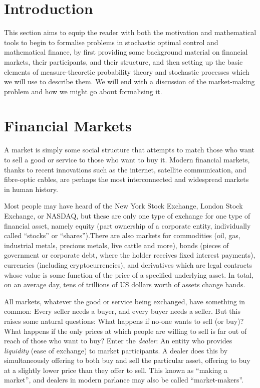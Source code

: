 \section{Introduction}
This section aims to equip the reader with both the motivation and mathematical 
tools to begin to formalise problems in stochastic optimal control and mathematical 
finance, by first providing some background material on financial markets, their 
participants, and their structure, and then setting up the basic elements of 
measure-theoretic probability theory and stochastic processes which we will use to 
describe them. We will end with a discussion of the market-making problem and how 
we might go about formalising it.

\section{Financial Markets}
A market is simply some social structure that attempts to match those who want to 
sell a good or service to those who want to buy it. Modern financial markets, 
thanks to recent innovations such as the internet, satellite communication, and 
fibre-optic cables, are perhaps the most interconnected and widespread markets in 
human history. 

Most people may have heard of the New York Stock Exchange, London Stock Exchange, 
or NASDAQ, but these are only one type of exchange for one type of financial asset, 
namely equity (part ownership of a corporate entity, individually called ``stocks'' 
or ``shares'').There are also markets for commodities (oil, gas, industrial metals, 
precious metals, live cattle and more), bonds (pieces of government or corporate 
debt, where the holder receives fixed interest payments), currencies (including 
cryptocurrencies), and derivatives which are legal contracts whose value is some 
function of the price of a specified underlying asset. In total, on an average day, 
tens of trillions of US dollars worth of assets change hands.

All markets, whatever the good or service being exchanged, have something in common: 
Every seller needs a buyer, and every buyer needs a seller. But this raises some 
natural questions: What happens if no-one wants to sell (or buy)? What happens if 
the only prices at which people are willing to sell is far out of reach of those 
who want to buy? Enter the \textit{dealer}: An entity who provides \textit{liquidity} 
(ease of exchange) to market participants. A dealer does this by simultaneously 
offering to both buy and sell the particular asset, offering to buy at a slightly 
lower price than they offer to sell. This known as ``making a market'', and dealers 
in modern parlance may also be called ``market-makers''.

